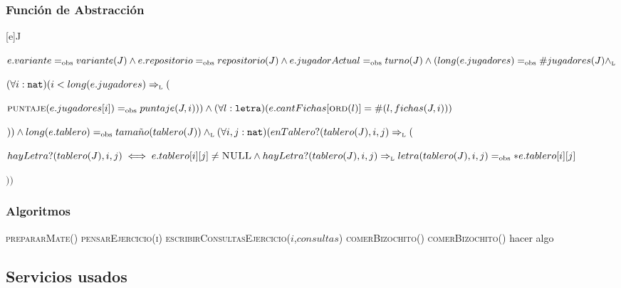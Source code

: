 \subsubsection*{Función de Abstracción}
[e]{J}{$
  e.variante=_{\mathrm{obs}} variante(J)\land\\
  e.repositorio=_{\mathrm{obs}} repositorio(J)\land\\
  e.jugadorActual=_{\mathrm{obs}} turno(J)\land\\
  (long(e.jugadores)=_{\mathrm{obs}} \#jugadores(J)\land_{\mathrm{\scriptscriptstyle{L}}}$
  \begin{adjustwidth}{11.4em}{0em}
  $(\forall i:\texttt{nat})(i<long(e.jugadores)\Rightarrow_{\mathrm{\scriptscriptstyle{L}}}($
  \begin{adjustwidth}{2em}{0em}
    $
    \textsc{puntaje}(e.jugadores[i])=_{\mathrm{obs}} puntaje(J,i)))\land\\
    (\forall l:\texttt{letra})(e.cantFichas[\textsc{ord}(l)]=\#(l,fichas(J,i)))
    $
  \end{adjustwidth}$))\land\\
  long(e.tablero)=_{\mathrm{obs}} tama\tilde{n}o(tablero(J))\land_{\mathrm{\scriptscriptstyle{L}}}\\
  (\forall i,j:\texttt{nat})(enTablero?(tablero(J),i,j)\Rightarrow_{\mathrm{\scriptscriptstyle{L}}}($
  \begin{adjustwidth}{2em}{0em}
    $
      hayLetra?(tablero(J),i,j)\iff e.tablero[i][j]\neq\textsc{NULL}\land\\
      hayLetra?(tablero(J),i,j)\Rightarrow_{\mathrm{\scriptscriptstyle{L}}} letra(tablero(J),i,j)=_{\mathrm{obs}} *e.tablero[i][j]
    $
  \end{adjustwidth}$))$
  \end{adjustwidth}
}

\subsubsection*{Algoritmos}
\begin{algorithm}[H]
  \begin{algorithmic}[1]
    \State{} 
    \State{} 
    \State{}
    \State\textsc{prepararMate()} 
    \State\textsc{pensarEjercicio(i)}
      \State\textsc{escribirConsultasEjercicio($i$,$consultas$)}
    \Else
      \State\textsc{comerBizochito()}
    \EndIf
      \State\textsc{comerBizochito()}
    \EndWhile
         \State hacer algo
    \EndFor
    \State{}
  \end{algorithmic}
\end{algorithm}

\subsection{Servicios usados}
\newpage

